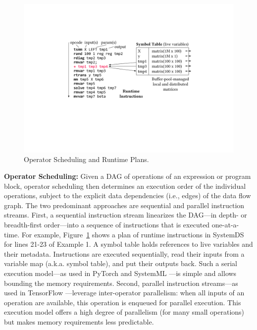 \begin{figure}[!t]
	\centering
	\includegraphics[scale=0.32]{figures/background}
	\vspace{-0.25cm}
	\caption{\label{fig:background}Operator Scheduling and Runtime Plans.}
\end{figure}

\textbf{Operator Scheduling:} Given a DAG of operations of an expression or program block, operator scheduling then determines an execution order of the individual operations, subject to the explicit data dependencies (i.e., edges) of the data flow graph. The two predominant approaches are sequential and parallel instruction streams. First, a sequential instruction stream linearizes the DAG---in depth- or breadth-first order---into a sequence of instructions that is executed one-at-a-time. For example, Figure~\ref{fig:background} shows a plan of runtime instructions in SystemDS for lines 21-23 of Example 1. A symbol table holds references to live variables and their metadata. Instructions are executed sequentially, read their inputs from a variable map (a.k.a. symbol table), and put their outputs back. Such a serial execution model---as used in PyTorch \cite{PaszkeGMLBCKLGA19} and SystemML \cite{BoehmDEEMPRRSST16,BoehmBERRSTT14}---is simple and allows bounding the memory requirements. Second, parallel instruction streams---as used in TensorFlow \cite{AbadiBCCDDDGIIK16}---leverage inter-operator parallelism: when all inputs of an operation are available, this operation is enqueued for parallel execution. This  execution model offers a high degree of parallelism (for many small operations) but makes memory requirements less predictable. 


